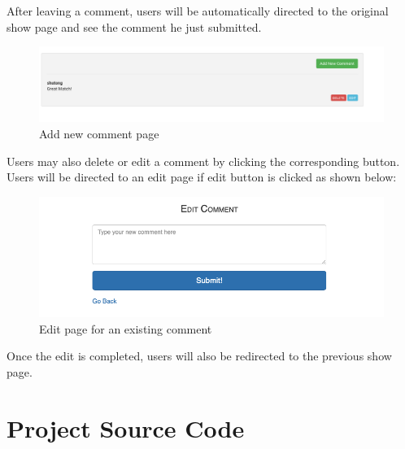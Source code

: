 \documentclass[a4paper]{article}
\begin{document}
\noindent After leaving a comment, users will be automatically directed to the original show page and see the comment he just submitted.

\begin{figure}[H]
\centering
\includegraphics[width=1.0\textwidth]{comment1.png}
\caption{\label{fig:fig11}Add new comment page}
\end{figure}

\noindent Users may also delete or edit a comment by clicking the corresponding button. Users will be directed to an edit page if edit button is clicked as shown below:

\begin{figure}[H]
\centering
\includegraphics[width=1.0\textwidth]{edit.png}
\caption{\label{fig:fig12}Edit page for an existing comment}
\end{figure}

\noindent Once the edit is completed, users will also be redirected to the previous show page.
\section{Project Source Code}
\end{document}
